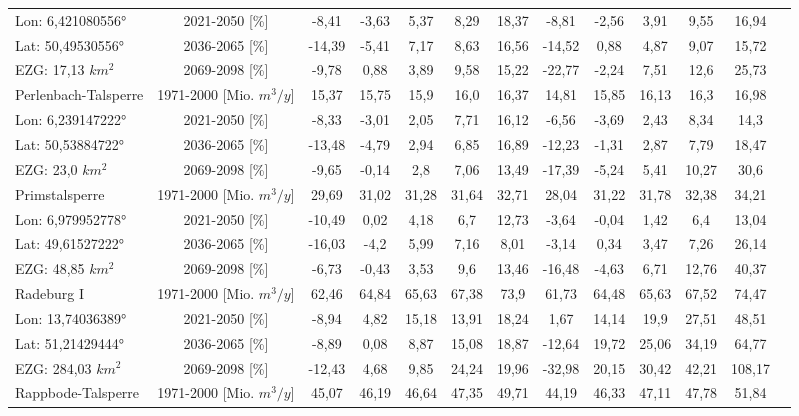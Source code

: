 \begin{longtable}{@{\extracolsep{\fill}}lc|ccccc||cccccc}
\cline{2-13} 
Lon: 6,421080556° & 2021-2050 [\%]  & -8,41 & -3,63 & 5,37 & 8,29 & 18,37 & -8,81 & -2,56 & 3,91 & 9,55 & 16,94 & \\ 
Lat: 50,49530556° & 2036-2065 [\%]  & -14,39 & -5,41 & 7,17 & 8,63 & 16,56 & -14,52 & 0,88 & 4,87 & 9,07 & 15,72 & \\ 
EZG: 17,13 $km^2$ & 2069-2098 [\%]  & -9,78 & 0,88 & 3,89 & 9,58 & 15,22 & -22,77 & -2,24 & 7,51 & 12,6 & 25,73 & \\ 
\hline 
Perlenbach-Talsperre & 1971-2000 [Mio. $m^3/y$]  & 15,37 & 15,75 & 15,9 & 16,0 & 16,37 & 14,81 & 15,85 & 16,13 & 16,3 & 16,98 & \\ 
\cline{2-13} 
Lon: 6,239147222° & 2021-2050 [\%]  & -8,33 & -3,01 & 2,05 & 7,71 & 16,12 & -6,56 & -3,69 & 2,43 & 8,34 & 14,3 & \\ 
Lat: 50,53884722° & 2036-2065 [\%]  & -13,48 & -4,79 & 2,94 & 6,85 & 16,89 & -12,23 & -1,31 & 2,87 & 7,79 & 18,47 & \\ 
EZG: 23,0 $km^2$ & 2069-2098 [\%]  & -9,65 & -0,14 & 2,8 & 7,06 & 13,49 & -17,39 & -5,24 & 5,41 & 10,27 & 30,6 & \\ 
\hline 
Primstalsperre & 1971-2000 [Mio. $m^3/y$]  & 29,69 & 31,02 & 31,28 & 31,64 & 32,71 & 28,04 & 31,22 & 31,78 & 32,38 & 34,21 & \\ 
\cline{2-13} 
Lon: 6,979952778° & 2021-2050 [\%]  & -10,49 & 0,02 & 4,18 & 6,7 & 12,73 & -3,64 & -0,04 & 1,42 & 6,4 & 13,04 & \\ 
Lat: 49,61527222° & 2036-2065 [\%]  & -16,03 & -4,2 & 5,99 & 7,16 & 8,01 & -3,14 & 0,34 & 3,47 & 7,26 & 26,14 & \\ 
EZG: 48,85 $km^2$ & 2069-2098 [\%]  & -6,73 & -0,43 & 3,53 & 9,6 & 13,46 & -16,48 & -4,63 & 6,71 & 12,76 & 40,37 & \\ 
\hline 
Radeburg I & 1971-2000 [Mio. $m^3/y$]  & 62,46 & 64,84 & 65,63 & 67,38 & 73,9 & 61,73 & 64,48 & 65,63 & 67,52 & 74,47 & \\ 
\cline{2-13} 
Lon: 13,74036389° & 2021-2050 [\%]  & -8,94 & 4,82 & 15,18 & 13,91 & 18,24 & 1,67 & 14,14 & 19,9 & 27,51 & 48,51 & \\ 
Lat: 51,21429444° & 2036-2065 [\%]  & -8,89 & 0,08 & 8,87 & 15,08 & 18,87 & -12,64 & 19,72 & 25,06 & 34,19 & 64,77 & \\ 
EZG: 284,03 $km^2$ & 2069-2098 [\%]  & -12,43 & 4,68 & 9,85 & 24,24 & 19,96 & -32,98 & 20,15 & 30,42 & 42,21 & 108,17 & \\ 
\hline 
Rappbode-Talsperre & 1971-2000 [Mio. $m^3/y$]  & 45,07 & 46,19 & 46,64 & 47,35 & 49,71 & 44,19 & 46,33 & 47,11 & 47,78 & 51,84 & \\ 

\end{longtable}
